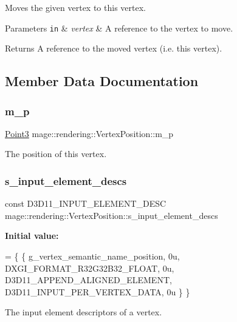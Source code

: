 Moves the given vertex to this vertex.


\begin{DoxyParams}[1]{Parameters}
\mbox{\tt in}  & {\em vertex} & A reference to the vertex to move. \\
\hline
\end{DoxyParams}
\begin{DoxyReturn}{Returns}
A reference to the moved vertex (i.\+e. this vertex). 
\end{DoxyReturn}


\subsection{Member Data Documentation}
\hypertarget{structmage_1_1rendering_1_1_vertex_position_a49602fa786c64fb0fca47a0a0992f779}{}\label{structmage_1_1rendering_1_1_vertex_position_a49602fa786c64fb0fca47a0a0992f779} 
\subsubsection{\texorpdfstring{m\+\_\+p}{m\_p}}
{\footnotesize\ttfamily \hyperlink{structmage_1_1_point3}{Point3} mage\+::rendering\+::\+Vertex\+Position\+::m\+\_\+p}

The position of this vertex. \hypertarget{structmage_1_1rendering_1_1_vertex_position_a094b822673f010526197174900dd4349}{}\label{structmage_1_1rendering_1_1_vertex_position_a094b822673f010526197174900dd4349} 
\subsubsection{\texorpdfstring{s\+\_\+input\+\_\+element\+\_\+descs}{s\_input\_element\_descs}}
{\footnotesize\ttfamily const D3\+D11\+\_\+\+I\+N\+P\+U\+T\+\_\+\+E\+L\+E\+M\+E\+N\+T\+\_\+\+D\+E\+SC mage\+::rendering\+::\+Vertex\+Position\+::s\+\_\+input\+\_\+element\+\_\+descs\hspace{0.3cm}{\ttfamily [static]}}

{\bfseries Initial value\+:}
\begin{DoxyCode}
= \{
        \{ g\_vertex\_semantic\_name\_position, 0u, DXGI\_FORMAT\_R32G32B32\_FLOAT,    0u, 
      D3D11\_APPEND\_ALIGNED\_ELEMENT, D3D11\_INPUT\_PER\_VERTEX\_DATA, 0u \}
    \}
\end{DoxyCode}
The input element descriptors of a vertex. 